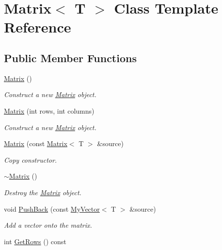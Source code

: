 \hypertarget{class_matrix}{}\section{Matrix$<$ T $>$ Class Template Reference}
\label{class_matrix}
\subsection*{Public Member Functions}
\begin{DoxyCompactItemize}
\item 
\mbox{\hyperlink{class_matrix_a9d567e3a121b1be0c3f9c461cab524fe}{Matrix}} ()
\begin{DoxyCompactList}\small\item\em Construct a new \mbox{\hyperlink{class_matrix}{Matrix}} object. \end{DoxyCompactList}\item 
\mbox{\hyperlink{class_matrix_a44eb4cf3a243fe027112d1ace474ead9}{Matrix}} (int rows, int columns)
\begin{DoxyCompactList}\small\item\em Construct a new \mbox{\hyperlink{class_matrix}{Matrix}} object. \end{DoxyCompactList}\item 
\mbox{\hyperlink{class_matrix_abc1e84ee28720ecc8a6807bb3f09f43e}{Matrix}} (const \mbox{\hyperlink{class_matrix}{Matrix}}$<$ T $>$ \&source)
\begin{DoxyCompactList}\small\item\em Copy constructor. \end{DoxyCompactList}\item 
\mbox{\hyperlink{class_matrix_a91aa704de674203e96aece9e1955ccd3}{$\sim$\+Matrix}} ()
\begin{DoxyCompactList}\small\item\em Destroy the \mbox{\hyperlink{class_matrix}{Matrix}} object. \end{DoxyCompactList}\item 
void \mbox{\hyperlink{class_matrix_af61aaa671b6bd354b27fb3aabbb65a9d}{Push\+Back}} (const \mbox{\hyperlink{class_my_vector}{My\+Vector}}$<$ T $>$ \&source)
\begin{DoxyCompactList}\small\item\em Add a vector onto the matrix. \end{DoxyCompactList}\item 
int \mbox{\hyperlink{class_matrix_aa665db4bc173a7bb4ec3f9da2676dfa6}{Get\+Rows}} () const

\end{DoxyCompactItemize}
